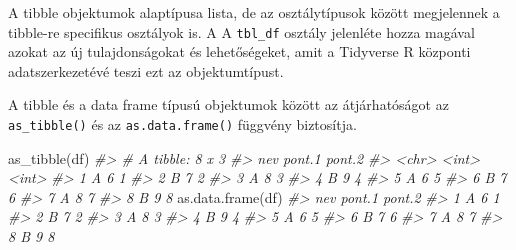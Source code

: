 \documentclass[
]{book}
\newenvironment{Shaded}{\begin{snugshade}}{\end{snugshade}}
\newcommand{\CommentTok}[1]{\textcolor[rgb]{0.56,0.35,0.01}{\textit{#1}}}
\newcommand{\FunctionTok}[1]{\textcolor[rgb]{0.00,0.00,0.00}{#1}}
\newcommand{\NormalTok}[1]{#1}
\begin{document}
A tibble objektumok alaptípusa lista, de az osztálytípusok között megjelennek a tibble-re specifikus osztályok is. A A \texttt{tbl\_df} osztály jelenléte hozza magával azokat az új tulajdonságokat és lehetőségeket, amit a Tidyverse R központi adatszerkezetévé teszi ezt az objektumtípust.

\begin{Shaded}
\end{Shaded}

A tibble és a data frame típusú objektumok között az átjárhatóságot az \texttt{as\_tibble()} és az \texttt{as.data.frame()} függvény biztosítja.

\begin{Shaded}
\begin{Highlighting}[]
\FunctionTok{as\_tibble}\NormalTok{(df)}
\CommentTok{\#\textgreater{} \# A tibble: 8 x 3}
\CommentTok{\#\textgreater{}   nev   pont.1 pont.2}
\CommentTok{\#\textgreater{}   \textless{}chr\textgreater{}  \textless{}int\textgreater{}  \textless{}int\textgreater{}}
\CommentTok{\#\textgreater{} 1 A          6      1}
\CommentTok{\#\textgreater{} 2 B          7      2}
\CommentTok{\#\textgreater{} 3 A          8      3}
\CommentTok{\#\textgreater{} 4 B          9      4}
\CommentTok{\#\textgreater{} 5 A          6      5}
\CommentTok{\#\textgreater{} 6 B          7      6}
\CommentTok{\#\textgreater{} 7 A          8      7}
\CommentTok{\#\textgreater{} 8 B          9      8}
\FunctionTok{as.data.frame}\NormalTok{(df)}
\CommentTok{\#\textgreater{}   nev pont.1 pont.2}
\CommentTok{\#\textgreater{} 1   A      6      1}
\CommentTok{\#\textgreater{} 2   B      7      2}
\CommentTok{\#\textgreater{} 3   A      8      3}
\CommentTok{\#\textgreater{} 4   B      9      4}
\CommentTok{\#\textgreater{} 5   A      6      5}
\CommentTok{\#\textgreater{} 6   B      7      6}
\CommentTok{\#\textgreater{} 7   A      8      7}
\CommentTok{\#\textgreater{} 8   B      9      8}
\end{Highlighting}
\end{Shaded}
\end{document}
